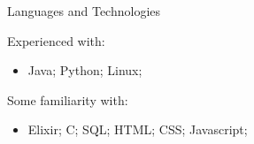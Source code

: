 \documentclass[]{mcdowellcv}
\begin{document}
	\begin{cvsection}{Languages and Technologies}
		\begin{cvsubsection}{}{}{}
            Experienced with:
			\begin{itemize}
				\item Java; Python; Linux;
            \end{itemize}
            Some familiarity with:
            \begin{itemize}
                \item Elixir; C; SQL; HTML; CSS; Javascript;
			\end{itemize}
		\end{cvsubsection}
	\end{cvsection}
\end{document}

